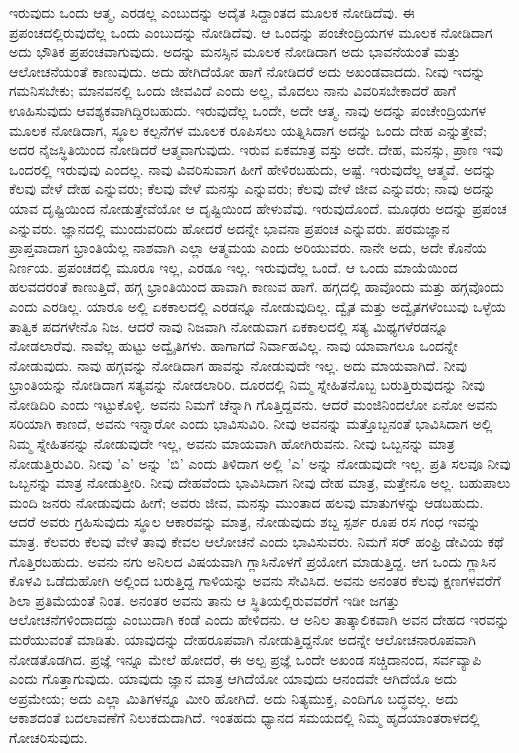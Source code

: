ಇರುವುದು ಒಂದು ಆತ್ಮ, ಎರಡಲ್ಲ ಎಂಬುದನ್ನು ಅದೈತ ಸಿದ್ದಾಂತದ ಮೂಲಕ ನೋಡಿದೆವು. ಈ ಪ್ರಪಂಚದಲ್ಲಿರುವುದೆಲ್ಲ ಒಂದು ಎಂಬುದನ್ನು ನೋಡಿದೆವು. ಆ ಒಂದನ್ನು ಪಂಚೇಂದ್ರಿಯಗಳ ಮೂಲಕ ನೋಡಿದಾಗ ಅದು ಭೌತಿಕ ಪ್ರಪಂಚವಾಗುವುದು. ಅದನ್ನು ಮನಸ್ಸಿನ ಮೂಲಕ ನೋಡಿದಾಗ ಅದು ಭಾವನೆಯಂತೆ ಮತ್ತು ಆಲೋಚನೆಯಂತೆ ಕಾಣುವುದು. ಅದು ಹೇಗಿದೆಯೋ ಹಾಗೆ ನೋಡಿದರೆ ಅದು ಅಖಂಡವಾದದು. ನೀವು ಇದನ್ನು ಗಮನಿಸಬೇಕು; ಮಾನವನಲ್ಲಿ ಒಂದು ಜೀವವಿದೆ ಎಂದು ಅಲ್ಲ, ಮೊದಲು ನಾನು ವಿವರಿಸಬೇಕಾದರೆ ಹಾಗೆ ಊಹಿಸುವುದು ಆವಶ್ಯಕವಾಗಿದ್ದಿರಬಹುದು. ಇರುವುದೆಲ್ಲ ಒಂದೇ, ಅದೇ ಆತ್ಮ. ನಾವು ಅದನ್ನು ಪಂಚೇಂದ್ರಿಯಗಳ ಮೂಲಕ ನೋಡಿದಾಗ, ಸ್ಥೂಲ ಕಲ್ಪನೆಗಳ ಮೂಲಕ ರೂಪಿಸಲು ಯತ್ನಿಸಿದಾಗ ಅದನ್ನು ಒಂದು ದೇಹ ಎನ್ನುತ್ತೇವೆ; ಅದರ ನೈಜಸ್ಥಿತಿಯಿಂದ ನೋಡಿದರೆ ಆತ್ಮವಾಗುವುದು. ಇರುವ ಏಕಮಾತ್ರ ವಸ್ತು ಅದೇ. ದೇಹ, ಮನಸ್ಸು, ಪ್ರಾಣ ಇವು ಒಂದರಲ್ಲಿ ಇರುವುವು ಎಂದಲ್ಲ. ನಾವು ವಿವರಿಸುವಾಗ ಹೀಗೆ ಹೇಳಿರಬಹುದು, ಅಷ್ಟೆ. ಇರುವುದೆಲ್ಲ ಆತ್ಮವೆ. ಅದನ್ನು ಕೆಲವು ವೇಳೆ ದೇಹ ಎನ್ನುವರು; ಕೆಲವು ವೇಳೆ ಮನಸ್ಸು ಎನ್ನುವರು; ಕೆಲವು ವೇಳೆ ಜೀವ ಎನ್ನುವರು; ನಾವು ಅದನ್ನು ಯಾವ ದೃಷ್ಟಿಯಿಂದ ನೋಡುತ್ತೇವೆಯೋ ಆ ದೃಷ್ಟಿಯಿಂದ ಹೇಳುವೆವು. ಇರುವುದೊಂದೆ. ಮೂಢರು ಅದನ್ನು ಪ್ರಪಂಚ ಎನ್ನುವರು. ಜ್ಞಾನದಲ್ಲಿ ಮುಂದುವರಿದು ಹೋದರೆ ಅದನ್ನೇ ಭಾವನಾ ಪ್ರಪಂಚ ಎನ್ನುವರು. ಪರಮಜ್ಞಾನ ಪ್ರಾಪ್ತವಾದಾಗ ಭ್ರಾಂತಿಯೆಲ್ಲ ನಾಶವಾಗಿ ಎಲ್ಲಾ ಆತ್ಮಮಯ ಎಂದು ಅರಿಯುವರು. ನಾನೇ ಅದು, ಅದೇ ಕೊನೆಯ ನಿರ್ಣಯ. ಪ್ರಪಂಚದಲ್ಲಿ ಮೂರೂ ಇಲ್ಲ, ಎರಡೂ ಇಲ್ಲ. ಇರುವುದೆಲ್ಲ ಒಂದೆ. ಆ ಒಂದು ಮಾಯೆಯಿಂದ ಹಲವದರಂತೆ ಕಾಣುತ್ತಿದೆ, ಹಗ್ಗ ಭ್ರಾಂತಿಯಿಂದ ಹಾವಾಗಿ ಕಾಣುವ ಹಾಗೆ. ಹಗ್ಗದಲ್ಲಿ ಹಾವೊಂದು ಮತ್ತು ಹಗ್ಗವೊಂದು ಎಂದು ಎರಡಿಲ್ಲ. ಯಾರೂ ಅಲ್ಲಿ ಏಕಕಾಲದಲ್ಲಿ ಎರಡನ್ನೂ ನೋಡುವುದಿಲ್ಲ. ದ್ವೈತ ಮತ್ತು ಅದ್ವೈತಗಳೆಂಬುವು ಒಳ್ಳೆಯ ತಾತ್ವಿಕ ಪದಗಳೇನೊ ನಿಜ. ಆದರೆ ನಾವು ನಿಜವಾಗಿ ನೋಡುವಾಗ ಏಕಕಾಲದಲ್ಲಿ ಸತ್ಯ ಮಿಥ್ಯಗಳೆರಡನ್ನೂ ನೋಡಲಾರೆವು. ನಾವೆಲ್ಲ ಹುಟ್ಟು ಅದ್ವೈತಿಗಳು. ಹಾಗಾಗದೆ ನಿರ್ವಾಹವಿಲ್ಲ. ನಾವು ಯಾವಾಗಲೂ ಒಂದನ್ನೇ ನೋಡುವುದು. ನಾವು ಹಗ್ಗವನ್ನು ನೋಡಿದಾಗ ಹಾವನ್ನು ನೋಡುವುದೇ ಇಲ್ಲ. ಅದು ಮಾಯವಾಗಿದೆ. ನೀವು ಭ್ರಾಂತಿಯನ್ನು ನೋಡಿದಾಗ ಸತ್ಯವನ್ನು ನೋಡಲಾರಿರಿ. ದೂರದಲ್ಲಿ ನಿಮ್ಮ ಸ್ನೇಹಿತನೊಬ್ಬ ಬರುತ್ತಿರುವುದನ್ನು ನೀವು ನೋಡಿದಿರಿ ಎಂದು ಇಟ್ಟುಕೊಳ್ಳಿ. ಅವನು ನಿಮಗೆ ಚೆನ್ನಾಗಿ ಗೊತ್ತಿದ್ದವನು. ಆದರೆ ಮಂಜಿನಿಂದಲೋ ಏನೋ ಅವನು ಸರಿಯಾಗಿ ಕಾಣದೆ, ಅವನು ಇನ್ನಾರೋ ಎಂದು ಭಾವಿಸುವಿರಿ. ನೀವು ಅವನನ್ನು ಮತ್ತೊಬ್ಬನಂತೆ ಭಾವಿಸಿದಾಗ ಅಲ್ಲಿ ನಿಮ್ಮ ಸ್ನೇಹಿತನನ್ನು ನೋಡುವುದೇ ಇಲ್ಲ, ಅವನು ಮಾಯವಾಗಿ ಹೋಗಿರುವನು. ನೀವು ಒಬ್ಬನನ್ನು ಮಾತ್ರ ನೋಡುತ್ತಿರುವಿರಿ. ನೀವು 'ಎ' ಅನ್ನು 'ಬಿ' ಎಂದು ತಿಳಿದಾಗ ಅಲ್ಲಿ 'ಎ' ಅನ್ನು ನೋಡುವುದೇ ಇಲ್ಲ. ಪ್ರತಿ ಸಲವೂ ನೀವು ಒಬ್ಬನನ್ನು ಮಾತ್ರ ನೋಡುತ್ತೀರಿ. ನೀವು ದೇಹವೆಂದು ಭಾವಿಸಿದಾಗ ನೀವು ದೇಹ ಮಾತ್ರ, ಮತ್ತೇನೂ ಅಲ್ಲ. ಬಹುಪಾಲು ಮಂದಿ ಜನರು ನೋಡುವುದು ಹೀಗೆ; ಅವರು ಜೀವ, ಮನಸ್ಸು ಮುಂತಾದ ಹಲವು ಮಾತುಗಳನ್ನು ಆಡಬಹುದು. ಆದರೆ ಅವರು ಗ್ರಹಿಸುವುದು ಸ್ಥೂಲ ಆಕಾರವನ್ನು ಮಾತ್ರ, ನೋಡುವುದು ಶಬ್ದ ಸ್ಪರ್ಶ ರೂಪ ರಸ ಗಂಧ ಇವನ್ನು ಮಾತ್ರ. ಕೆಲವರು ಕೆಲವು ವೇಳೆ ತಾವು ಕೇವಲ ಆಲೋಚನೆ ಎಂದು ಭಾವಿಸುವರು. ನಿಮಗೆ ಸರ್ ಹಂಫ್ರಿ ಡೇವಿಯ ಕಥೆ ಗೊತ್ತಿರಬಹುದು. ಅವನು ನಗು ಅನಿಲದ ವಿಷಯವಾಗಿ ಗ್ಲಾಸಿನೊಳಗೆ ಪ್ರಯೋಗ ಮಾಡುತ್ತಿದ್ದ. ಆಗ ಒಂದು ಗ್ಲಾಸಿನ ಕೊಳವಿ ಒಡೆದುಹೋಗಿ ಅಲ್ಲಿಂದ ಬರುತ್ತಿದ್ದ ಗಾಳಿಯನ್ನು ಅವನು ಸೇವಿಸಿದ. ಅವನು ಅನಂತರ ಕೆಲವು ಕ್ಷಣಗಳವರೆಗೆ ಶಿಲಾ ಪ್ರತಿಮೆಯಂತೆ ನಿಂತ. ಅನಂತರ ಅವನು ತಾನು ಆ ಸ್ಥಿತಿಯಲ್ಲಿರುವವರೆಗೆ ಇಡೀ ಜಗತ್ತು ಆಲೋಚನೆಗಳಿಂದಾದದ್ದು ಎಂಬುದಾಗಿ ಕಂಡೆ ಎಂದು ಹೇಳಿದನು. ಆ ಅನಿಲ ತಾತ್ಕಾಲಿಕವಾಗಿ ಅವನ ದೇಹದ ಇರವನ್ನು ಮರೆಯುವಂತೆ ಮಾಡಿತು. ಯಾವುದನ್ನು ದೇಹರೂಪವಾಗಿ ನೋಡುತ್ತಿದ್ದನೋ ಅದನ್ನೇ ಆಲೋಚನಾರೂಪವಾಗಿ ನೋಡತೊಡಗಿದ. ಪ್ರಜ್ಞೆ ಇನ್ನೂ ಮೇಲೆ ಹೋದರೆ, ಈ ಅಲ್ಪ ಪ್ರಜ್ಞೆ ಒಂದೇ ಅಖಂಡ ಸಚ್ಚಿದಾನಂದ, ಸರ್ವವ್ಯಾಪಿ ಎಂದು ಗೊತ್ತಾಗುವುದು. ಯಾವುದು ಜ್ಞಾನ ಮಾತ್ರ ಆಗಿದೆಯೋ ಯಾವುದು ಆನಂದವೇ ಆಗಿದೆಯೊ ಅದು ಅಪ್ರಮೇಯ; ಅದು ಎಲ್ಲಾ ಮಿತಿಗಳನ್ನೂ ಮೀರಿ ಹೋಗಿದೆ. ಅದು ನಿತ್ಯಮುಕ್ತ, ಎಂದಿಗೂ ಬದ್ಧವಲ್ಲ. ಅದು ಆಕಾಶದಂತೆ ಬದಲಾವಣೆಗೆ ನಿಲುಕದುದಾಗಿದೆ. ಇಂತಹದು ಧ್ಯಾನದ ಸಮಯದಲ್ಲಿ ನಿಮ್ಮ ಹೃದಯಾಂತರಾಳದಲ್ಲಿ ಗೋಚರಿಸುವುದು.

